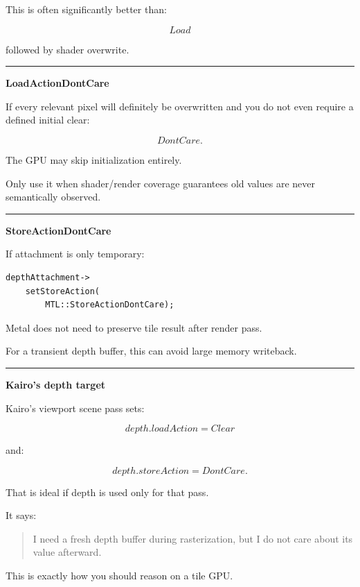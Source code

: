 This is often significantly better than:

\[
Load
\]

followed by shader overwrite.

\begin{center}\rule{0.5\linewidth}{0.5pt}\end{center}

\textbf{LoadActionDontCare}

If every relevant pixel will definitely be overwritten and you do not even require a defined initial clear:

\[
DontCare.
\]

The GPU may skip initialization entirely.

Only use it when shader/render coverage guarantees old values are never semantically observed.

\begin{center}\rule{0.5\linewidth}{0.5pt}\end{center}

\textbf{StoreActionDontCare}

If attachment is only temporary:

\begin{verbatim}
depthAttachment->
    setStoreAction(
        MTL::StoreActionDontCare);
\end{verbatim}

Metal does not need to preserve tile result after render pass.

For a transient depth buffer, this can avoid large memory writeback.

\begin{center}\rule{0.5\linewidth}{0.5pt}\end{center}

\textbf{Kairo's depth target}

Kairo's viewport scene pass sets:

\[
depth.loadAction=Clear
\]

and:

\[
depth.storeAction=DontCare.
\]

That is ideal if depth is used only for that pass.

It says:

\begin{quote}
I need a fresh depth buffer during rasterization, but I do not care about its value afterward.
\end{quote}

This is exactly how you should reason on a tile GPU.

